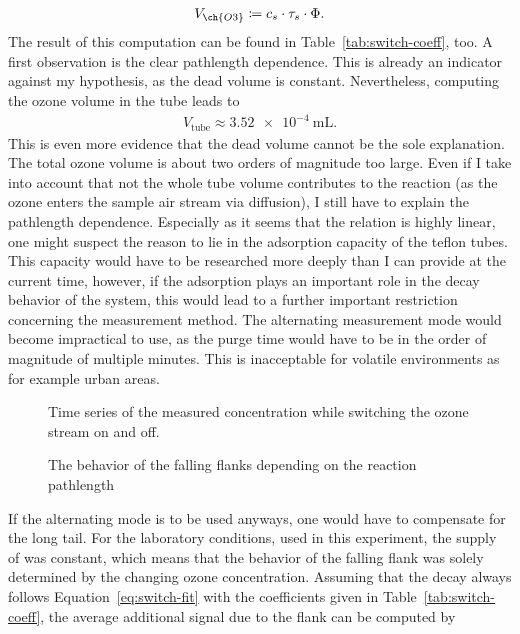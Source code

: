 \begin{align*}
  V_{\ch{O3}} \coloneqq  c_s \cdot \tau_s \cdot \Phi.
\end{align*}
The result of this computation can be found in
Table~\ref{tab:switch-coeff}, too. A first observation is the clear
pathlength dependence. This is already an indicator against my
hypothesis, as the dead volume is constant. Nevertheless, computing
the ozone volume in the tube leads to
\begin{align*}
  V_{\text{tube}} \approx \SI{3.52e-4}{\milli\liter}.
\end{align*}
This is even more evidence that the dead volume cannot be the sole
explanation. The total ozone volume is about two orders of magnitude
too large. Even if I take into account that not the whole tube volume
contributes to the reaction (as the ozone enters the sample air stream
via diffusion), I still have to explain the pathlength
dependence. Especially as it seems that the relation is highly linear,
one might suspect the reason to lie in the adsorption capacity of the
teflon tubes. This capacity would have to be researched more deeply
than I can provide at the current time, however, if the adsorption
plays an important role in the decay behavior of the system, this
would lead to a further important restriction concerning the
measurement method. The alternating measurement mode would become
impractical to use, as the purge time would have to be in the order of
magnitude of multiple minutes. This is inacceptable for volatile
environments as for example urban areas.

\begin{figure}[htbp]
  \centering
  
  \caption{Time series of the measured  concentration while
    switching the ozone stream on and off.}
  \label{fig:switch}
\end{figure}
\begin{figure}[htbp]
  \centering
  
  \caption{The behavior of the falling flanks depending on the
    reaction pathlength}
  \label{fig:switch-pl}
\end{figure}

If the alternating mode is to be used anyways, one would have to
compensate for the long tail. For the laboratory conditions, used in
this experiment, the supply of  was constant, which means that
the behavior of the falling flank was solely determined by the
changing ozone concentration. Assuming that the decay always follows
Equation~\eqref{eq:switch-fit} with the coefficients given in
Table~\ref{tab:switch-coeff}, the average additional  signal
due to the flank can be computed by

